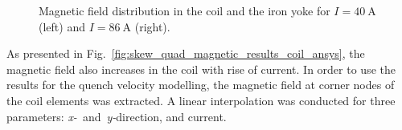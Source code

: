 \begin{figure}[H]
    \centering
    \caption{Magnetic field distribution in the coil and the iron yoke for $I=40~\text{A}$ (left) and $I=86~\text{A}$ (right).}
    \label{fig:skew_quad_magnetic_results_geometry_ansys}
\end{figure}

As presented in Fig.~\ref{fig:skew_quad_magnetic_results_coil_ansys}, the magnetic field also increases in the coil with rise of current. In order to use the results for the quench velocity modelling, the magnetic field at corner nodes of the coil elements was extracted. A linear interpolation was conducted for three parameters: \textit{x-}~and~\textit{y-}direction, and current.

